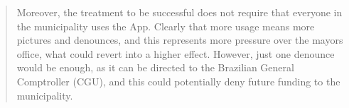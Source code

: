 \documentclass[12pt,a4paper,]{article}
\begin{document}
\begin{quotation}
Moreover, the treatment to be successful does not require that everyone in the
municipality uses the App. Clearly that more usage means more pictures and
denounces, and this represents more pressure over the mayors office, what could
revert into a higher effect. However, just one denounce would be enough, as it
can be directed to the Brazilian General Comptroller (CGU), and this could
potentially deny future funding to the municipality.




\end{quotation}

\newpage
\setlength{\parindent}{0cm}
\setlength{\parskip}{5pt}


\end{document}
